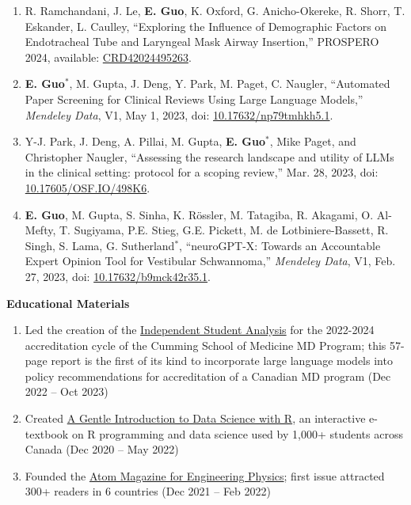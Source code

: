 \documentclass{article}
\begin{document}
\begin{enumerate}
    \item R. Ramchandani, J. Le, \textbf{E. Guo}, K. Oxford, G. Anicho-Okereke, R. Shorr, T. Eskander, L. Caulley, ``Exploring the Influence of Demographic Factors on Endotracheal Tube and Laryngeal Mask Airway Insertion,'' PROSPERO 2024, available: \href{https://www.crd.york.ac.uk/prospero/display_record.php?ID=CRD42024495263}{CRD42024495263}.
    \item \textbf{E. Guo}$^*$, M. Gupta, J. Deng, Y. Park, M. Paget, C. Naugler, ``Automated Paper Screening for Clinical Reviews Using Large Language Models,'' \textit{Mendeley Data}, V1, May 1, 2023, doi: \href{https://doi.org/10.17632/np79tmhkh5.1}{10.17632/np79tmhkh5.1}.
    \item Y-J. Park, J. Deng, A. Pillai, M. Gupta, \textbf{E. Guo}$^*$, Mike Paget, and Christopher Naugler, ``Assessing the research landscape and utility of LLMs in the clinical setting: protocol for a scoping review,'' Mar. 28, 2023, doi: \href{https://osf.io/498k6}{10.17605/OSF.IO/498K6}.
    \item \textbf{E. Guo}, M. Gupta, S. Sinha, K. R\"ossler, M. Tatagiba, R. Akagami, O. Al-Mefty, T. Sugiyama, P.E. Stieg, G.E. Pickett, M. de Lotbiniere-Bassett, R. Singh, S. Lama, G. Sutherland$^*$, ``neuroGPT-X: Towards an Accountable Expert Opinion Tool for Vestibular Schwannoma,'' \textit{Mendeley Data}, V1, Feb. 27, 2023, doi: \href{https://doi.org/10.17632/b9mck42r35.1}{10.17632/b9mck42r35.1}.
\end{enumerate} \vspace{1em}

\textbf{Educational Materials} \vspace{.5em}

\begin{enumerate}
    \item Led the creation of the \href{https://cumming.ucalgary.ca/about/ume-accreditation}{Independent Student Analysis} for the 2022-2024 accreditation cycle of the Cumming School of Medicine MD Program; this 57-page report is the first of its kind to incorporate large language models into policy recommendations for accreditation of a Canadian MD program (Dec 2022 -- Oct 2023)
    \item Created \href{https://youreka-textbook.netlify.app/}{A Gentle Introduction to Data Science with R}, an interactive e-textbook on R programming and data science used by 1,000+ students across Canada (Dec 2020 -- May 2022)
    \item Founded the \href{https://atom-winter-2022.netlify.app/}{Atom Magazine for Engineering Physics}; first issue attracted 300+ readers in 6 countries (Dec 2021 -- Feb 2022)
\end{enumerate}
\end{document}
